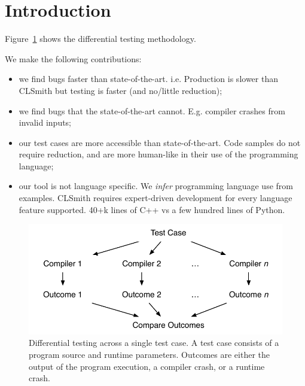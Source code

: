 \section{Introduction}\label{sec:intro}

Figure~\ref{fig:difftest} shows the differential testing methodology.


We make the following contributions:
%
\begin{itemize}
\item we find bugs faster than state-of-the-art. i.e. Production is slower than CLSmith but testing is faster (and no/little reduction);
\item we find bugs that the state-of-the-art cannot. E.g. compiler crashes from invalid inputs;
\item our test cases are more accessible than state-of-the-art. Code samples do not require reduction, and are more human-like in their use of the programming language;
\item our tool is not language specific. We \emph{infer} programming language use from examples. CLSmith requires expert-driven development for every language feature supported. 40+k lines of C++ vs a few hundred lines of Python.
\end{itemize}

\begin{figure}
  \centering
  \includegraphics[width=.9\columnwidth]{img/difftest} %
  \caption{%
    Differential testing across a single test case. A test case consists of a program source and runtime parameters. Outcomes are either the output of the program execution, a compiler crash, or a runtime crash.%
  }%
  \label{fig:difftest}
\end{figure}
